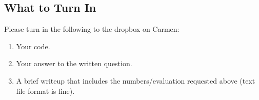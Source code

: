 \documentclass[12pt, letterpaper]{article}
\begin{document}
\vspace{-.1in}
\subsection*{What to Turn In}
Please turn in the following to the dropbox on Carmen:

\begin{enumerate}
  \item Your code.
  \item Your answer to the written question.
  \item A brief writeup that includes the numbers/evaluation requested above (text file format is fine).
\end{enumerate}
\end{document}
